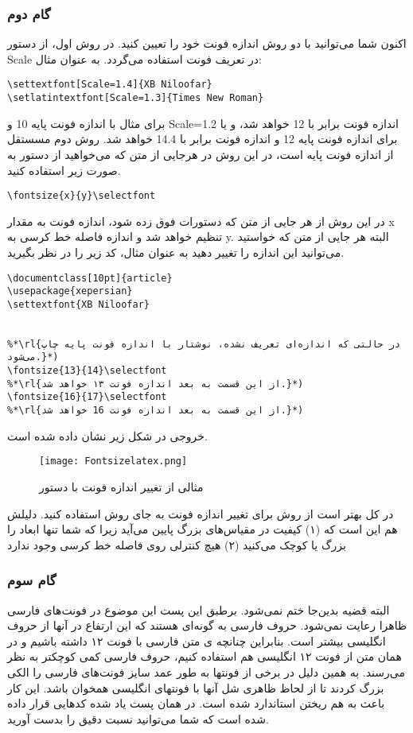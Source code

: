 \subsubsection{گام دوم}
اکنون شما می‌توانید با دو روش اندازه فونت خود را تعیین کنید. در روش اول، از دستور Scale در تعریف فونت استفاده می‌گردد. به عنوان مثال:
\begin{latin}
\begin{lstlisting}[style=Tex]
\settextfont[Scale=1.4]{XB Niloofar}
\setlatintextfont[Scale=1.3]{Times New Roman}
\end{lstlisting}
\end{latin}
برای مثال با اندازه فونت پایه 10 و Scale=1.2 اندازه فونت برابر با 12 خواهد شد، و یا برای اندازه فونت پایه 12 و  اندازه فونت برابر با 14.4 خواهد شد. روش دوم مسستقل از اندازه فونت پایه است، در این روش در هرجایی از متن که می‌خواهید از دستور  به صورت زیر استفاده کنید.
\begin{latin}
\begin{lstlisting}[style=Tex]
\fontsize{x}{y}\selectfont
\end{lstlisting}
\end{latin}
در این روش از هر جایی از متن که دستورات فوق زده شود، اندازه فونت به مقدار x تنظیم خواهد شد و اندازه فاصله خط کرسی به y. البته هر جایی از متن که خواستید می‌توانید این اندازه را تغییر دهید به عنوان مثال، کد زیر را در نظر بگیرید.
\begin{latin}
\begin{lstlisting}[style=Tex]
\documentclass[10pt]{article}
\usepackage{xepersian}
\settextfont{XB Niloofar}
 

%*\rl{در حالتی که اندازه‌ای تعریف نشده، نوشتار با اندازه فونت پایه چاپ می‌شود.}*)
\fontsize{13}{14}\selectfont
%*\rl{از این قسمت به بعد اندازه فونت ۱۳ خواهد شد.}*)
\fontsize{16}{17}\selectfont
%*\rl{از این قسمت به بعد اندازه فونت 16 خواهد شد.}*)

\end{lstlisting}
\end{latin}
خروجی در شکل زیر نشان داده شده است. 
\begin{figure}[h!]
 \centering\texttt{[image: Fontsizelatex.png]}
 \caption{مثالی از تغییر اندازه فونت با دستور }
 \end{figure}
 در کل بهتر است از روش  برای تغییر اندازه فونت به جای روش  استفاده کنید. دلیلش هم این است که (۱) کیفیت در مقیاس‌های بزرگ پایین می‌آید زیرا که شما تنها ابعاد را بزرگ یا کوچک می‌کنید (۲) هیچ کنترلی روی فاصله خط کرسی وجود ندارد
\subsubsection{گام سوم}
البته قضیه بدین‌جا ختم نمی‌شود. برطبق این پست این موضوع در فونت‌های فارسی ظاهرا رعایت نمی‌شود. حروف فارسی به گونه‌ای هستند که این ارتفاع در آنها از حروف انگلیسی بیشتر است. بنابراین چنانچه ی متن فارسی با فونت ۱۲ داشته باشیم و در همان متن از فونت ۱۲ انگلیسی هم استفاده کنیم، حروف فارسی کمی کوچکتر به نظر می‌رسند. به همین دلیل در برخی از فونتها به طور عمد سایز فونت‌های فارسی را الکی بزرگ کردند تا از لحاظ ظاهری شل آنها با فونتهای انگلیسی همخوان باشد. این کار باعث به هم ریختن استاندارد شده است. در همان پست یاد شده کدهایی قرار داده شده است که شما می‌توانید نسبت دقیق را بدست آورید.
